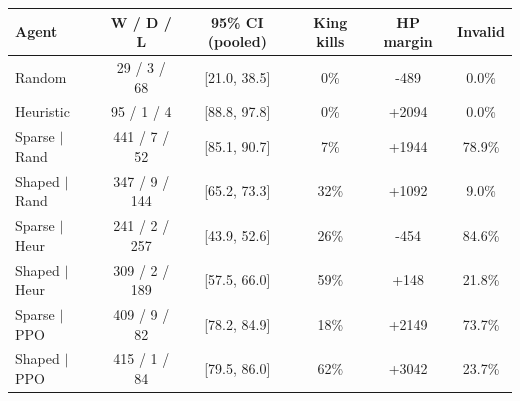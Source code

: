 \begin{tabular}{lccccc}
\toprule
Agent & W / D / L & 95\% CI (pooled) & King kills & HP margin & Invalid \\
\midrule
Random & 29 / 3 / 68 & [21.0, 38.5] & 0\% & -489 & 0.0\% \\
Heuristic & 95 / 1 / 4 & [88.8, 97.8] & 0\% & +2094 & 0.0\% \\
Sparse $|$ Rand & 441 / 7 / 52 & [85.1, 90.7] & 7\% & +1944 & 78.9\% \\
Shaped $|$ Rand & 347 / 9 / 144 & [65.2, 73.3] & 32\% & +1092 & 9.0\% \\
Sparse $|$ Heur & 241 / 2 / 257 & [43.9, 52.6] & 26\% & -454 & 84.6\% \\
Shaped $|$ Heur & 309 / 2 / 189 & [57.5, 66.0] & 59\% & +148 & 21.8\% \\
Sparse $|$ PPO & 409 / 9 / 82 & [78.2, 84.9] & 18\% & +2149 & 73.7\% \\
Shaped $|$ PPO & 415 / 1 / 84 & [79.5, 86.0] & 62\% & +3042 & 23.7\% \\
\bottomrule
\end{tabular}
